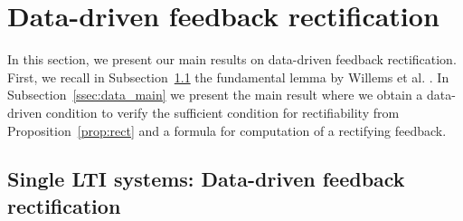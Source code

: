 \documentclass[11pt]{article}
\theoremstyle{plain}
\theoremstyle{definition}
\theoremstyle{remark}
\begin{document}
\section{Data-driven feedback rectification}
\label{sec:main_data}

In this section, we present our main results on data-driven feedback rectification. First, we recall in Subsection~\ref{ssec:data_LTI} the fundamental lemma by Willems et al. \cite{Willems2005}. In Subsection~\ref{ssec:data_main} we present the main result where we obtain a data-driven condition to verify the sufficient condition for rectifiability from Proposition~\ref{prop:rect} and a formula for computation of a rectifying feedback.

\subsection{Single LTI systems: Data-driven feedback rectification}
\label{ssec:data_LTI}
\end{document}
